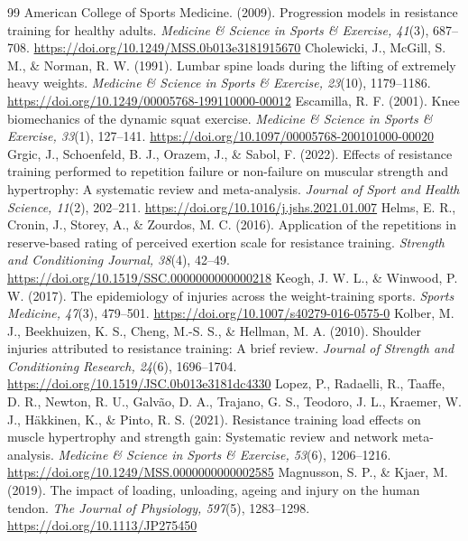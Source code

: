\documentclass[11pt,a4paper]{article}
\begin{document}
\begin{thebibliography}{99}\small
{} American College of Sports Medicine. (2009). Progression models in resistance training for healthy adults. \emph{Medicine \& Science in Sports \& Exercise, 41}(3), 687--708. \url{https://doi.org/10.1249/MSS.0b013e3181915670}
 Cholewicki, J., McGill, S. M., \& Norman, R. W. (1991). Lumbar spine loads during the lifting of extremely heavy weights. \emph{Medicine \& Science in Sports \& Exercise, 23}(10), 1179--1186. \url{https://doi.org/10.1249/00005768-199110000-00012}
 Escamilla, R. F. (2001). Knee biomechanics of the dynamic squat exercise. \emph{Medicine \& Science in Sports \& Exercise, 33}(1), 127--141. \url{https://doi.org/10.1097/00005768-200101000-00020}
 Grgic, J., Schoenfeld, B. J., Orazem, J., \& Sabol, F. (2022). Effects of resistance training performed to repetition failure or non-failure on muscular strength and hypertrophy: A systematic review and meta-analysis. \emph{Journal of Sport and Health Science, 11}(2), 202--211. \url{https://doi.org/10.1016/j.jshs.2021.01.007}
 Helms, E. R., Cronin, J., Storey, A., \& Zourdos, M. C. (2016). Application of the repetitions in reserve-based rating of perceived exertion scale for resistance training. \emph{Strength and Conditioning Journal, 38}(4), 42--49. \url{https://doi.org/10.1519/SSC.0000000000000218}
 Keogh, J. W. L., \& Winwood, P. W. (2017). The epidemiology of injuries across the weight-training sports. \emph{Sports Medicine, 47}(3), 479--501. \url{https://doi.org/10.1007/s40279-016-0575-0}
 Kolber, M. J., Beekhuizen, K. S., Cheng, M.-S. S., \& Hellman, M. A. (2010). Shoulder injuries attributed to resistance training: A brief review. \emph{Journal of Strength and Conditioning Research, 24}(6), 1696--1704. \url{https://doi.org/10.1519/JSC.0b013e3181dc4330}
 Lopez, P., Radaelli, R., Taaffe, D. R., Newton, R. U., Galvão, D. A., Trajano, G. S., Teodoro, J. L., Kraemer, W. J., Häkkinen, K., \& Pinto, R. S. (2021). Resistance training load effects on muscle hypertrophy and strength gain: Systematic review and network meta-analysis. \emph{Medicine \& Science in Sports \& Exercise, 53}(6), 1206--1216. \url{https://doi.org/10.1249/MSS.0000000000002585}
 Magnusson, S. P., \& Kjaer, M. (2019). The impact of loading, unloading, ageing and injury on the human tendon. \emph{The Journal of Physiology, 597}(5), 1283--1298. \url{https://doi.org/10.1113/JP275450}

\end{thebibliography}
\end{document}
